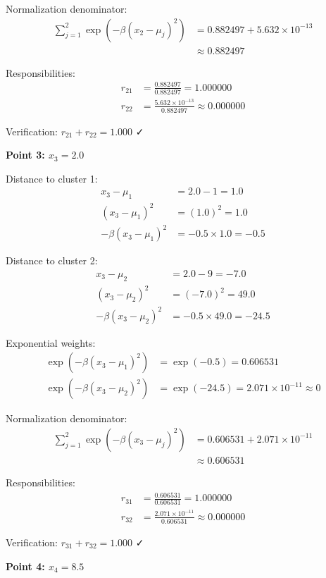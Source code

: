 \documentclass[12pt]{article}
\begin{document}
\begin{solution}
Normalization denominator:
\begin{align*}
\sum_{j=1}^2 \exp(-\beta(x_2 - \mu_j)^2) &= 0.882497 + 5.632 \times 10^{-13} \\
&\approx 0.882497
\end{align*}

Responsibilities:
\begin{align*}
r_{21} &= \frac{0.882497}{0.882497} = 1.000000 \\
r_{22} &= \frac{5.632 \times 10^{-13}}{0.882497} \approx 0.000000
\end{align*}

Verification: $r_{21} + r_{22} = 1.000$ ✓

\textbf{Point 3: $x_3 = 2.0$}

Distance to cluster 1:
\begin{align*}
x_3 - \mu_1 &= 2.0 - 1 = 1.0 \\
(x_3 - \mu_1)^2 &= (1.0)^2 = 1.0 \\
-\beta(x_3 - \mu_1)^2 &= -0.5 \times 1.0 = -0.5
\end{align*}

Distance to cluster 2:
\begin{align*}
x_3 - \mu_2 &= 2.0 - 9 = -7.0 \\
(x_3 - \mu_2)^2 &= (-7.0)^2 = 49.0 \\
-\beta(x_3 - \mu_2)^2 &= -0.5 \times 49.0 = -24.5
\end{align*}

Exponential weights:
\begin{align*}
\exp(-\beta(x_3 - \mu_1)^2) &= \exp(-0.5) = 0.606531 \\
\exp(-\beta(x_3 - \mu_2)^2) &= \exp(-24.5) = 2.071 \times 10^{-11} \approx 0
\end{align*}

Normalization denominator:
\begin{align*}
\sum_{j=1}^2 \exp(-\beta(x_3 - \mu_j)^2) &= 0.606531 + 2.071 \times 10^{-11} \\
&\approx 0.606531
\end{align*}

Responsibilities:
\begin{align*}
r_{31} &= \frac{0.606531}{0.606531} = 1.000000 \\
r_{32} &= \frac{2.071 \times 10^{-11}}{0.606531} \approx 0.000000
\end{align*}

Verification: $r_{31} + r_{32} = 1.000$ ✓

\textbf{Point 4: $x_4 = 8.5$}


\end{solution}
\end{document}
